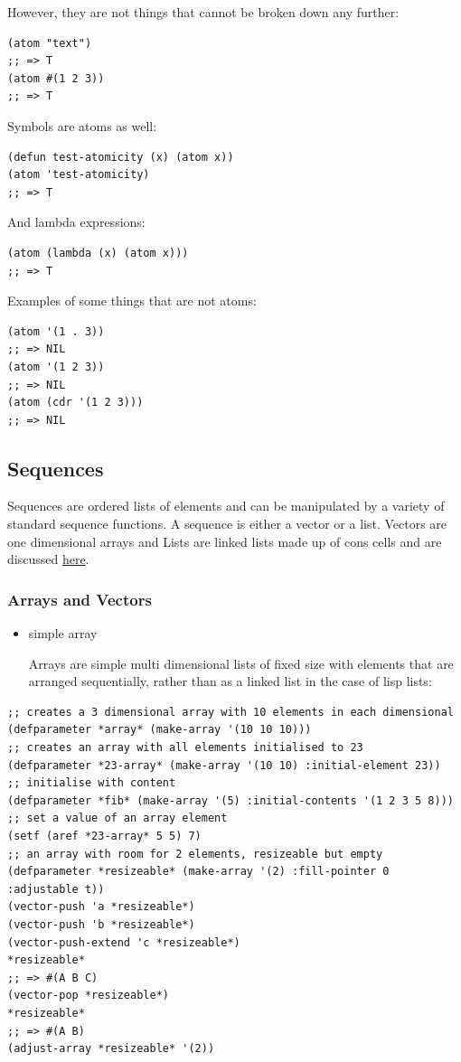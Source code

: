\documentclass[11pt]{article}
\begin{document}
However, they are not things that cannot be broken down any further:

\begin{verbatim}
(atom "text")
;; => T
(atom #(1 2 3))
;; => T
\end{verbatim}

Symbols are atoms as well:

\begin{verbatim}
(defun test-atomicity (x) (atom x))
(atom 'test-atomicity)
;; => T
\end{verbatim}

And lambda expressions:

\begin{verbatim}
(atom (lambda (x) (atom x)))
;; => T
\end{verbatim}

Examples of some things that are not atoms:

\begin{verbatim}
(atom '(1 . 3))
;; => NIL
(atom '(1 2 3))
;; => NIL
(atom (cdr '(1 2 3)))
;; => NIL
\end{verbatim}

\subsection{Sequences}
\label{sec-5-2}
Sequences are ordered lists of elements and can be manipulated by a
variety of standard sequence functions. A sequence is either a
vector or a list. Vectors are one dimensional arrays and Lists are
linked lists made up of cons cells and are discussed \hyperref[sec-5-2-3]{here}.

\subsubsection{Arrays and Vectors}
\label{sec-5-2-1}
\begin{itemize}
\item simple array

Arrays are simple multi dimensional lists of fixed size with
elements that are arranged sequentially, rather than as a linked
list in the case of lisp lists:
\end{itemize}

\begin{verbatim}
;; creates a 3 dimensional array with 10 elements in each dimensional
(defparameter *array* (make-array '(10 10 10)))
;; creates an array with all elements initialised to 23
(defparameter *23-array* (make-array '(10 10) :initial-element 23))
;; initialise with content
(defparameter *fib* (make-array '(5) :initial-contents '(1 2 3 5 8)))
;; set a value of an array element
(setf (aref *23-array* 5 5) 7)
;; an array with room for 2 elements, resizeable but empty
(defparameter *resizeable* (make-array '(2) :fill-pointer 0 :adjustable t))
(vector-push 'a *resizeable*)
(vector-push 'b *resizeable*)
(vector-push-extend 'c *resizeable*)
*resizeable*
;; => #(A B C)
(vector-pop *resizeable*)
*resizeable*
;; => #(A B)
(adjust-array *resizeable* '(2))
\end{verbatim}
\end{document}

